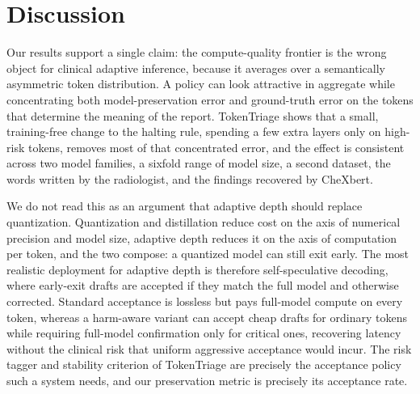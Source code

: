 \documentclass[11pt]{article}
\newcommand{\method}{\mbox{TokenTriage}}
\begin{document}
\section{Discussion}
\label{sec:discussion}
Our results support a single claim: the compute-quality frontier is the wrong object for clinical
adaptive inference, because it averages over a semantically asymmetric token distribution. A policy can
look attractive in aggregate while concentrating both model-preservation error and ground-truth error
on the tokens that determine the meaning of the report. \method{} shows that a small, training-free
change to the halting rule, spending a few extra layers only on high-risk tokens, removes most of that
concentrated error, and the effect is consistent across two model families, a sixfold range of model
size, a second dataset, the words written by the radiologist, and the findings recovered by CheXbert.

We do not read this as an argument that adaptive depth should replace quantization. Quantization and
distillation reduce cost on the axis of numerical precision and model size, adaptive depth reduces it
on the axis of computation per token, and the two compose: a quantized model can still exit early. The
most realistic deployment for adaptive depth is therefore self-speculative decoding, where early-exit
drafts are accepted if they match the full model and otherwise corrected. Standard acceptance is
lossless but pays full-model compute on every token, whereas a harm-aware variant can accept cheap
drafts for ordinary tokens while requiring full-model confirmation only for critical ones, recovering
latency without the clinical risk that uniform aggressive acceptance would incur. The risk tagger and
stability criterion of \method{} are precisely the acceptance policy such a system needs, and our
preservation metric is precisely its acceptance rate.
\end{document}
